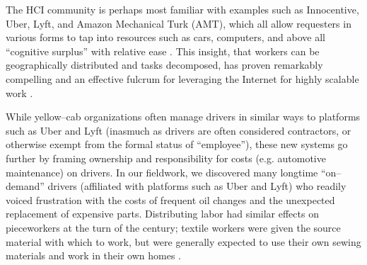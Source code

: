 \documentclass{sigchi}
\newcommand{\msb}[1]{{\color{PineGreen}[MSB: #1]}}
\begin{document}

The HCI community is perhaps most familiar with examples such as
Innocentive,
Uber, Lyft,
and Amazon Mechanical Turk (AMT),
which all allow requesters in various forms to tap into
resources such as
cars,
computers, and above all
``cognitive surplus''
with relative ease
\cite{howe2006rise,DillahuntPromise,storiesIraniSilberman,shirky2010cognitive}.
This insight, that
workers can be geographically distributed and tasks decomposed,
has proven remarkably compelling
and an effective fulcrum for leveraging the Internet for highly scalable work
\cite{sensitiveTasks,embracingErrorKrishna}.

While yellow--cab organizations often manage drivers in similar ways to platforms such as Uber and Lyft
(inasmuch as drivers are often considered contractors, or otherwise exempt from the formal status of ``employee''),
these new systems go further
by framing ownership and responsibility for costs
(e.g. automotive maintenance)
on drivers.
In our fieldwork, we discovered many longtime ``on--demand'' drivers
(affiliated with platforms such as Uber and Lyft)
who readily voiced frustration with the costs of
frequent oil changes and the unexpected replacement of expensive parts.
Distributing labor had similar effects on pieceworkers at the turn of the  century;
textile workers were given the source material with which to work,
but were generally expected to use their own sewing materials and work in their own homes
\cite{hapke2004sweatshop}.
\end{document}
